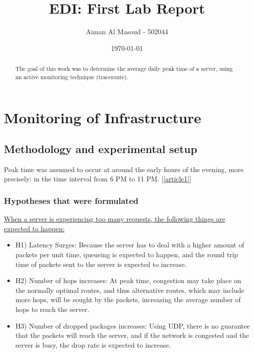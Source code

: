 \documentclass[a4paper,10pt]{article}
\begin{document}
\title{EDI: First Lab Report}
\author{Aiman Al Masoud - 502044}
\date{\today}

\maketitle

\begin{abstract}
The goal of this work was to determine the average daily peak time of a server, using an active monitoring technique (traceroute).
\end{abstract}

\clearpage

\setcounter{page}{1}

\section{Monitoring of Infrastructure}


\subsection{Methodology and experimental setup}


Peak time was assumed to occur at around the early hours of the evening, more precisely: in the time interval from 6 PM to 11 PM. [\ref{article1}]


\maketitle
\subsubsection{Hypotheses that were formulated}



\underline{When a server is experiencing too many requests, the following things are expected to happen: }


\begin{itemize}

\item H1) Latency Surges: Because the server has to deal with a higher amount of packets per unit time, queueing is expected to happen, and the round trip time of packets sent to the server is expected to increase.

\item H2) Number of hops increases: At peak time, congestion may take place on the normally optimal routes, and thus alternative routes, which may include more hops, will be sought by the packets, increasing the average number of hops to reach the server.

\item H3) Number of dropped packages increases: Using UDP, there is no guarantee that the packets will reach the server, and if the network is congested and the server is busy, the drop rate is expected to increase.

\end{itemize}
\end{document}
